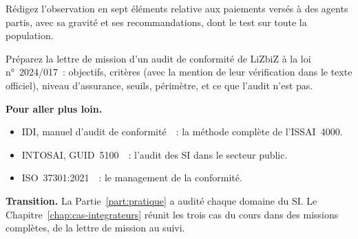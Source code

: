 \begin{boxexo}[title={\ding{45}\quad Exercice~25.9. L'observation de l'ANPP \niveauexpert}]
Rédigez l'observation en sept éléments relative aux paiements versés à des
agents partis, avec sa gravité et ses recommandations, dont le test sur
toute la population.
\end{boxexo}

\begin{boxexo}[title={\ding{45}\quad Exercice~25.10. Un audit des données personnelles \niveauexpert}]
Préparez la lettre de mission d'un audit de conformité de LiZbiZ à la loi
n°~2024/017~: objectifs, critères (avec la mention de leur vérification
dans le texte officiel), niveau d'assurance, seuils, périmètre, et ce que
l'audit n'est pas.
\end{boxexo}

\bigskip

\begin{boxinfo}
\textbf{Pour aller plus loin.}
\begin{itemize}
    \item IDI, manuel d'audit de conformité~\cite{idi2021conformite}~: la
          méthode complète de l'ISSAI~4000.
    \item INTOSAI, GUID~5100~\cite{intosai2019guid5100}~: l'audit des SI
          dans le secteur public.
    \item ISO~37301:2021~\cite{iso37301_2021}~: le management de la
          conformité.
\end{itemize}
\end{boxinfo}

\begin{boxinfo}
\textbf{Transition.} La Partie~\ref{part:pratique} a audité chaque domaine
du SI. Le Chapitre~\ref{chap:cas-integrateurs} réunit les trois cas du
cours dans des missions complètes, de la lettre de mission au suivi.
\end{boxinfo}
